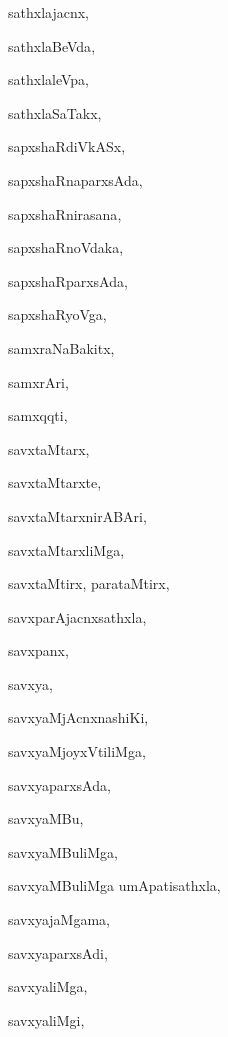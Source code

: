\begin{multicols}{2}
{sathxlajacnx}, \pageref{sathxlajacnx}

{sathxlaBeVda}, \pageref{sathxlaBeVda}

{sathxlaleVpa}, \pageref{sathxlaleVpa}

{sathxlaSaTakx}, \pageref{sathxlaSaTakx}

{sapxshaRdiVkASx}, \pageref{sapxshaRdiVkASx}

{sapxshaRnaparxsAda}, \pageref{sapxshaRnaparxsAda}

{sapxshaRnirasana}, \pageref{sapxshaRnirasana}

{sapxshaRnoVdaka}, \pageref{sapxshaRnoVdaka}

{sapxshaRparxsAda}, \pageref{sapxshaRparxsAda}

{sapxshaRyoVga}, \pageref{sapxshaRyoVga}

{samxraNaBakitx}, \pageref{samxraNaBakitx}

{samxrAri}, \pageref{samxrAri}

{samxqqti}, \pageref{samxqqti}

{savxtaMtarx}, \pageref{savxtaMtarx}

{savxtaMtarxte}, \pageref{savxtaMtarxte}

{savxtaMtarxnirABAri}, \pageref{savxtaMtarxnirABAri}

{savxtaMtarxliMga}, \pageref{savxtaMtarxliMga}

{savxtaMtirx, parataMtirx}, \pageref{savxtaMtirx, parataMtirx}

{savxparAjacnxsathxla}, \pageref{savxparAjacnxsathxla}

{savxpanx}, \pageref{savxpanx}

{savxya}, \pageref{savxya}

{savxyaMjAcnxnashiKi}, \pageref{savxyaMjAcnxnashiKi}

{savxyaMjoyxVtiliMga}, \pageref{savxyaMjoyxVtiliMga}

{savxyaparxsAda}, \pageref{savxyaparxsAda}

{savxyaMBu}, \pageref{savxyaMBu}

{savxyaMBuliMga}, \pageref{savxyaMBuliMga}

{savxyaMBuliMga umApatisathxla}, \pageref{savxyaMBuliMgaumApatisathxla}

{savxyajaMgama}, \pageref{savxyajaMgama}

{savxyaparxsAdi}, \pageref{savxyaparxsAdi}

{savxyaliMga}, \pageref{savxyaliMga}

{savxyaliMgi}, \pageref{savxyaliMgi}


\end{multicols}
